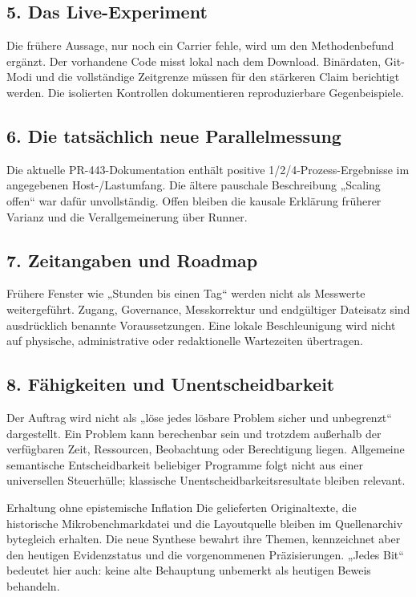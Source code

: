 \begin{cols}
\subsection*{5. Das Live-Experiment}
Die frühere Aussage, nur noch ein Carrier fehle, wird um den Methodenbefund ergänzt. Der vorhandene Code misst lokal nach dem Download. Binärdaten, Git-Modi und die vollständige Zeitgrenze müssen für den stärkeren Claim berichtigt werden. Die isolierten Kontrollen dokumentieren reproduzierbare Gegenbeispiele.

\subsection*{6. Die tatsächlich neue Parallelmessung}
Die aktuelle PR-443-Dokumentation enthält positive 1/2/4-Prozess-Ergebnisse im angegebenen Host-/Lastumfang. Die ältere pauschale Beschreibung „Scaling offen“ war dafür unvollständig. Offen bleiben die kausale Erklärung früherer Varianz und die Verallgemeinerung über Runner.

\subsection*{7. Zeitangaben und Roadmap}
Frühere Fenster wie „Stunden bis einen Tag“ werden nicht als Messwerte weitergeführt. Zugang, Governance, Messkorrektur und endgültiger Dateisatz sind ausdrücklich benannte Voraussetzungen. Eine lokale Beschleunigung wird nicht auf physische, administrative oder redaktionelle Wartezeiten übertragen.

\subsection*{8. Fähigkeiten und Unentscheidbarkeit}
Der Auftrag wird nicht als „löse jedes lösbare Problem sicher und unbegrenzt“ dargestellt. Ein Problem kann berechenbar sein und trotzdem außerhalb der verfügbaren Zeit, Ressourcen, Beobachtung oder Berechtigung liegen. Allgemeine semantische Entscheidbarkeit beliebiger Programme folgt nicht aus einer universellen Steuerhülle; klassische Unentscheidbarkeitsresultate bleiben relevant. 

\begin{boundary}{Erhaltung ohne epistemische Inflation}
Die gelieferten Originaltexte, die historische Mikrobenchmarkdatei und die Layoutquelle bleiben im Quellenarchiv bytegleich erhalten. Die neue Synthese bewahrt ihre Themen, kennzeichnet aber den heutigen Evidenzstatus und die vorgenommenen Präzisierungen. „Jedes Bit“ bedeutet hier auch: keine alte Behauptung unbemerkt als heutigen Beweis behandeln.
\end{boundary}
\end{cols}


